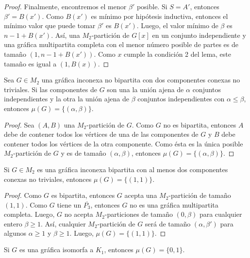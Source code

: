 \begin{proof}
Finalmente, encontremos el menor $\beta'$ posible. Si $S=A'$, entonces $\beta'=B(x')$. Como $B(x')$ es mínimo por hip\'otesis inductiva, entonces el mínimo valor que puede tomar $\beta'$ es $B(x')$. Luego, el valor mínimo de $\beta$ es $n-1+B(x')$. Así, una $M_2$-partición de $G[x]$ en un conjunto independiente y una gráfica multipartita completa con el menor número posible de partes es de tamaño $(1,n-1+B(x'))$. Como $x$ cumple la condición 2 del lema, este tamaño es igual a $(1,B(x))$.

\end{proof}

\begin{lemma}\label{lema_parejas_04}
Sea $G\in M_2$ una gráfica inconexa no bipartita con dos componentes conexas no triviales. Si las componentes de $G$ son una la unión ajena de $\alpha$ conjuntos independientes y la otra la unión ajena de $\beta$ conjuntos independientes con $\alpha \le \beta$, entonces $\mu(G)=\{(\alpha,\beta)\}$.
\end{lemma}

\begin{proof}
Sea $(A,B)$ una $M_2$-partición de $G$. Como $G$ no es bipartita, entonces $A$ debe de contener todos los vértices de una de las componentes de $G$ y $B$ debe contener todos los vértices de la otra componente. Como ésta es la única posible $M_2$-partición de $G$ y es de tamaño $(\alpha, \beta)$, entonces $\mu(G)=\{(\alpha,\beta)\}$.
\end{proof}

\begin{lemma}\label{lema_parejas_05}
Si $G \in M_2$ es una gráfica inconexa bipartita con al menos dos componentes conexas no triviales, entonces $\mu(G)=\{(1,1)\}$.
\end{lemma}

\begin{proof}
Como $G$ es bipartita, entonces $G$ acepta una $M_2$-partición de tamaño
$(1,1)$. Como $G$ tiene un $\overline{P_3}$, entonces $G$ no es una gráfica
multipartita completa. Luego, $G$ no acepta $M_2$-particiones de tamaño
$(0,\beta)$ para cualquier entero $\beta \ge 1$. Así, cualquier
$M_2$-partición de $G$ será de tamaño $(\alpha,\beta')$ para algunos
$\alpha \ge 1$ y $\beta \ge 1$. Luego, $\mu(G)=\{(1,1)\}$.
\end{proof}

\begin{lemma}\label{lema_parejas_06}
Si $G$ es una gráfica isomorfa a $K_1$, entonces $\mu(G)=\{0,1\}$.
\end{lemma}

